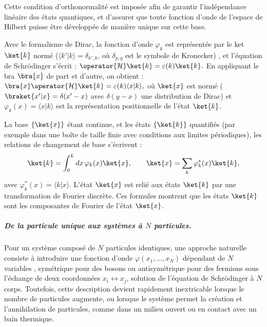 \medskip

Cette condition d’orthonormalité est imposée afin de garantir l’indépendance linéaire des états quantiques, et d'assurer que toute fonction d’onde de l’espace de Hilbert puisse être développée de manière unique sur cette base. 


\medskip

Avec le formalisme de Dirac, la fonction d’onde $\varphi_k$ est représentée par le ket $\ket{k}$ normé (\ie $\langle k' \vert k \rangle = \delta_{k', k}$, où $\delta_{p,q}$ est le symbole de Kronecker)
, et l’équation de Schrödinger s’écrit :
\(
\operator{\mathcal{H}} \ket{k} = \varepsilon(k) \ket{k}.
\)
En appliquant le bra $\bra{x}$ de part et d’autre, on obtient :
\(
\bra{x} \operator{\mathcal{H}} \ket{k} = \varepsilon(k) \langle x \vert k \rangle,
\)
où $\ket{x}$ est normé (\ie $\braket{x'\vert x} = \delta ( x' - x ) $ avec $\delta ( y - x )$ une distribution de Dirac) et $\varphi_k(x) = \langle x \vert k \rangle$ est la représentation positionnelle de l’état $\ket{k}$.


\begin{mdframed}[
	linewidth=0.5pt, 
	backgroundcolor=gray!5, 
	roundcorner=50pt,	
	innerleftmargin=5pt,
    innerrightmargin=5pt,
    innertopmargin=1pt,
    innerbottommargin=2pt,
    leftmargin=2pt,
    rightmargin=2pt
	]
La base $\{\ket{x}\}$ étant continue, et les états $\{\ket{k}\}$ quantifiés (par exemple dans une boîte de taille finie avec conditions aux limites périodiques), les relations de changement de base s’écrivent :
\begin{eqnarray}\label{chap.1:eq.rapel.etat.prim.1}
	\ket{k} = \int_0^L dx \, \varphi_k(x) \ket{x}, \qquad   
	\ket{x} = \sum_k \varphi_k^\ast(x) \ket{k},
\end{eqnarray}
avec $\varphi_k^\ast(x) = \langle k \vert x \rangle$. L’état $\ket{x}$ est relié aux états $\ket{k}$ par une transformation de Fourier discrète. Ces formules montrent que les états $\ket{k}$ sont les composantes de Fourier de l’état $\ket{x}$.
\end{mdframed}


\subparagraph{De la particule unique aux systèmes à $N$ particules.}

Pour un système composé de $N$ particules identiques, une approche naturelle consiste à introduire une fonction d’onde $\varphi(x_1, \dots, x_N)$ dépendant de $N$ variables , symétrique pour des bosons ou antisymétrique pour des fermions sous l’échange de deux coordonnées $x_i \leftrightarrow x_j$, solution de l’équation de Schrödinger à $N$ corps. 
Toutefois, cette description devient rapidement inextricable lorsque le nombre de particules augmente, ou lorsque le système permet la création et l’annihilation de particules, comme dans un milieu ouvert ou en contact avec un bain thermique.


